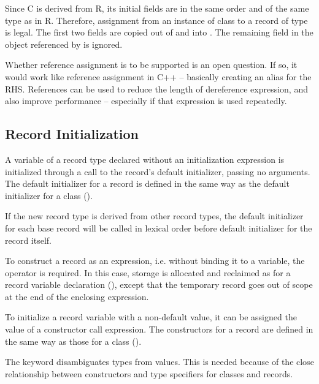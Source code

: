 Since C is derived from R, its initial fields are in the same order and of the
same type as in R.  Therefore, assignment from an instance of class  to
a record of type  is legal.
The first two fields are copied out of  and into .  The
remaining field in the object referenced by  is ignored.

\begin{openissue}
Whether reference assignment is to be supported is an open question.
If so, it would work like reference assignment in C++ -- basically creating an
alias for the RHS.
References can be used to reduce the length of dereference expression, and also
improve performance -- especially if that expression is used repeatedly.
\end{openissue}

\subsection{Record Initialization}
\label{Record_Initialization}

A variable of a record type declared without an initialization expression
is initialized through a call to the record's default initializer, passing no arguments.
The default initializer for a record is defined in the same way as the default
initializer for a class ().

If the new record type is derived from other record types, the
default initializer for each base record will be called in lexical order before default
initializer for the record itself.

To construct a record as an expression,
i.e. without binding it to a variable, the  operator is
required.  In this case, storage is allocated and reclaimed as for a record
variable declaration (), except that the temporary record
goes out of scope at the end of the enclosing expression.

To initialize a record variable with a non-default value, it can be assigned
the value of a constructor call expression.  The constructors for a record are
defined in the same way as those for a class ().

\begin{rationale}
The  keyword disambiguates types from values. This is needed because of the close
relationship between constructors and type specifiers for classes and
records.
\end{rationale}

